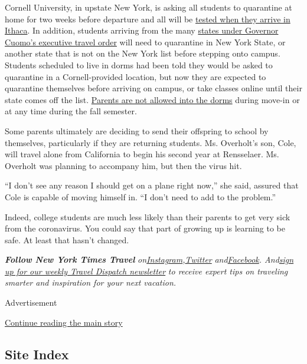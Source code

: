 Cornell University, in upstate New York, is asking all students to
quarantine at home for two weeks before departure and all will be
\href{https://covid.cornell.edu/students/move-in/}{tested when they
arrive in Ithaca}. In addition, students arriving from the many
\href{https://coronavirus.health.ny.gov/covid-19-travel-advisory}{states
under Governor Cuomo's executive travel order} will need to quarantine
in New York State, or another state that is not on the New York list
before stepping onto campus. Students scheduled to live in dorms had
been told they would be asked to quarantine in a Cornell-provided
location, but now they are expected to quarantine themselves before
arriving on campus, or take classes online until their state comes off
the list. \href{https://covid.cornell.edu/students/move-in/}{Parents are
not allowed into the dorms} during move-in or at any time during the
fall semester.

Some parents ultimately are deciding to send their offspring to school
by themselves, particularly if they are returning students. Ms.
Overholt's son, Cole, will travel alone from California to begin his
second year at Rensselaer. Ms. Overholt was planning to accompany him,
but then the virus hit.

``I don't see any reason I should get on a plane right now,'' she said,
assured that Cole is capable of moving himself in. ``I don't need to add
to the problem.''

Indeed, college students are much less likely than their parents to get
very sick from the coronavirus. You could say that part of growing up is
learning to be safe. At least that hasn't changed.

\emph{\textbf{Follow New York Times Travel}}
\emph{on}\href{https://www.instagram.com/nytimestravel/}{\emph{Instagram}}\emph{,}\href{https://twitter.com/nytimestravel}{\emph{Twitter}}
\emph{and}\href{https://www.facebook.com/nytimestravel/}{\emph{Facebook}}\emph{.
And}\href{https://www.nytimes.com/newsletters/traveldispatch}{\emph{sign
up for our weekly Travel Dispatch newsletter}} \emph{to receive expert
tips on traveling smarter and inspiration for your next vacation.}

Advertisement

\protect\hyperlink{after-bottom}{Continue reading the main story}

\hypertarget{site-index}{%
\subsection{Site Index}\label{site-index}}

